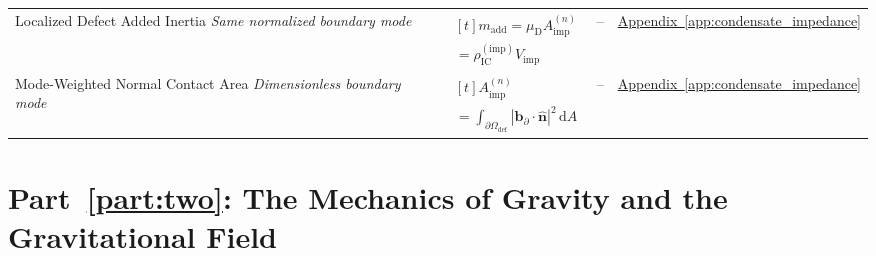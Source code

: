 \begin{longtable}{@{} p{4.5cm} p{6cm} c p{4cm} @{}}
{\raggedright Localized Defect Added Inertia \newline \textit{Same normalized boundary mode}\par} & {\raggedright $\begin{gathered}[t]m_{\mathrm{add}}=\mu_{\mathrm D}A_{\mathrm{imp}}^{(n)} \\ =\rho_{\mathrm{IC}}^{(\mathrm{imp})}V_{\mathrm{imp}}\end{gathered}$\par} & -- & {\raggedright \hyperref[app:condensate_impedance]{Appendix~\ref*{app:condensate_impedance}}\par} \\

{\raggedright Mode-Weighted Normal Contact Area \newline \textit{Dimensionless boundary mode}\par} & {\raggedright $\begin{gathered}[t]A_{\mathrm{imp}}^{(n)} \\ =\int_{\partial\Omega_{\mathrm{def}}}|\mathbf b_\partial\!\cdot\widehat{\mathbf n}|^2\,\mathrm dA\end{gathered}$\par} & -- & {\raggedright \hyperref[app:condensate_impedance]{Appendix~\ref*{app:condensate_impedance}}\par} \\

\bottomrule
\end{longtable}

\par\ifdim\dimexpr\pagegoal-\pagetotal\relax<12\baselineskip\newpage\fi
\section*{Part~\ref{part:two}: The Mechanics of Gravity and the Gravitational Field}


